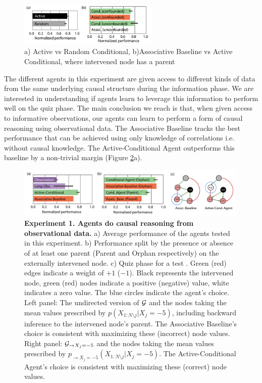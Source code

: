 \begin{figure}
\centering
\includegraphics[width=0.6\textwidth, trim = {0 0cm 0 0.7cm}] {figures/fig2_conf_unconf_pars_act_pass_combined.pdf}
\caption{a) Active vs Random Conditional, b)Associative Baseline vs Active Conditional, where intervened node has a parent}
\label{fig:expt1_extra}
\end{figure}
The different agents in this experiment are given access to different kinds of data from the same underlying causal structure during the information phase. We are interested in understanding if agents learn to leverage this information to perform well on the quiz phase. The main conclusion we reach is that, when given access to informative observations, our agents can learn to perform a form of causal reasoning using observational data. The Associative Baseline tracks the best performance that can be achieved using only knowledge of correlations i.e. without causal knowledge. The Active-Conditional Agent outperforms this baseline  by a non-trivial margin (Figure \ref{fig:expt1}a). 

\begin{figure}[t!]
\centering
   \includegraphics[width=0.99\textwidth]{figures/fig_expt1.pdf}
    \caption{\textbf{Experiment 1. Agents do causal reasoning from observational data.} a) Average performance of the agents tested in this experiment. b) Performance split by the presence or absence of at least one parent (Parent and Orphan respectively) on the externally intervened node. c) Quiz phase for a test \CBN. Green (red) edges indicate a weight of $+1$ ($-1$). Black represents the intervened node, green (red) nodes indicate a positive (negative) value, white indicates a zero value. The blue circles indicate the agent's choice. Left panel: The undirected version of ${\cal G}$ and the nodes taking the mean values prescribed by $p(X_{1:N\setminus j }|X_j=-5)$, including backward inference to the intervened node's parent. The Associative Baseline's choice is consistent with maximizing these (incorrect) node values. Right panel: ${\cal G}_{\rightarrow X_j=-5}$ and the nodes taking the mean values prescribed by $p_{\rightarrow X_j=-5}(X_{1:N\setminus j }|X_j=-5)$. The Active-Conditional Agent's choice is consistent with maximizing these (correct) node values.}%
    \label{fig:expt1}%
\end{figure}


